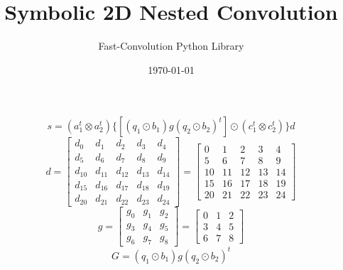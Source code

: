 \documentclass{article}%
\title{Symbolic 2D Nested Convolution}%
\author{Fast{-}Convolution Python Library}%
\date{\today}%
\begin{document}
%
\normalsize%
\maketitle%
\[%
s=(a_1^t \otimes a_2^t) \{[(q_1 \odot b_1) g (q_2 \odot b_2)^t] \odot (c_1^t \otimes c_2^t)\} d%
\]%
\[%
d = \left[\begin{matrix}d_{0} & d_{1} & d_{2} & d_{3} & d_{4}\\d_{5} & d_{6} & d_{7} & d_{8} & d_{9}\\d_{10} & d_{11} & d_{12} & d_{13} & d_{14}\\d_{15} & d_{16} & d_{17} & d_{18} & d_{19}\\d_{20} & d_{21} & d_{22} & d_{23} & d_{24}\end{matrix}\right] = \left[\begin{matrix}0 & 1 & 2 & 3 & 4\\5 & 6 & 7 & 8 & 9\\10 & 11 & 12 & 13 & 14\\15 & 16 & 17 & 18 & 19\\20 & 21 & 22 & 23 & 24\end{matrix}\right]%
\]%
\[%
g = \left[\begin{matrix}g_{0} & g_{1} & g_{2}\\g_{3} & g_{4} & g_{5}\\g_{6} & g_{7} & g_{8}\end{matrix}\right] = \left[\begin{matrix}0 & 1 & 2\\3 & 4 & 5\\6 & 7 & 8\end{matrix}\right]%
\]%
\[%
G = (q_1 \odot b_1) g (q_2 \odot b_2)^t%
\]%
\end{document}
